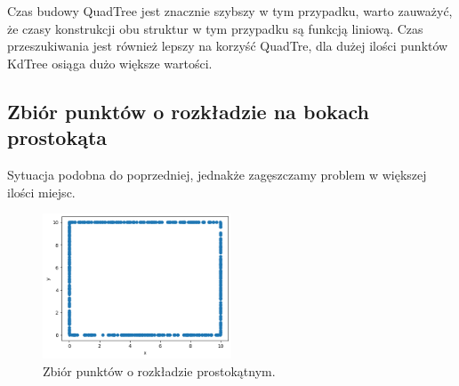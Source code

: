 \documentclass{lab}
\begin{document}
Czas budowy QuadTree jest znacznie szybszy w tym przypadku, warto zauważyć, że czasy konstrukcji obu struktur w tym przypadku są funkcją liniową. Czas przeszukiwania jest również lepszy na korzyść QuadTre, dla dużej ilości punktów KdTree osiąga dużo większe wartości.
\newpage
\subsection{Zbiór punktów o rozkładzie na bokach prostokąta}
Sytuacja podobna do poprzedniej, jednakże zagęszczamy problem w większej ilości miejsc.

\begin{figure}[H]
  \centering
  \includegraphics[width=0.5\textwidth]{resources/rectangle.png}
  \caption{Zbiór punktów o rozkładzie prostokątnym.}
  \label{fig:rectangle}
\end{figure}
\end{document}
